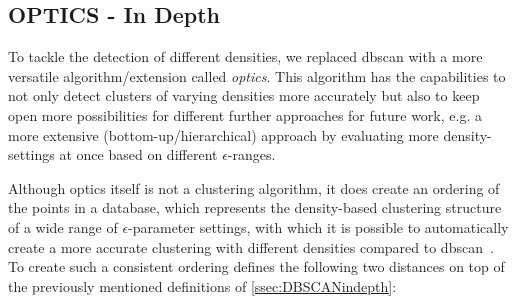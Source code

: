 \subsection{OPTICS - In Depth}\label{ssec:OPTICSindepth} %
To tackle the detection of different densities, we replaced \gls{dbscan} with a more versatile algorithm/extension called \textit{\acrfull{optics}}. This algorithm has the capabilities to not only detect clusters of varying densities more accurately but also to keep open more possibilities for different further approaches for future work, e.g. a more extensive (bottom-up/hierarchical) approach by evaluating more density-settings at once based on different $\epsilon$-ranges.

Although \gls{optics} itself is not a clustering algorithm, it does create an ordering of the points in a database, which represents the density-based clustering structure of a wide range of $\epsilon$-parameter settings, with which it is possible to automatically create a more accurate clustering with different densities compared to \gls{dbscan}~\cite{opticsankerst1999optics}. To create such a consistent ordering  \citeauthor{opticsankerst1999optics} defines the following two distances on top of the previously mentioned definitions of \autoref{ssec:DBSCANindepth}:
\vspace{5mm}

